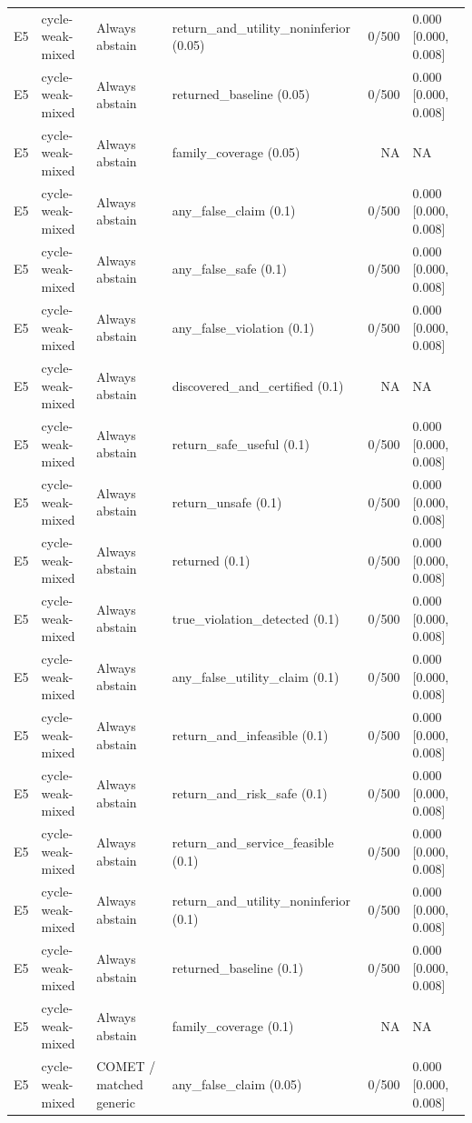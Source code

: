 \begin{longtable}{p{.04\linewidth}p{.18\linewidth}p{.19\linewidth}p{.16\linewidth}r p{.21\linewidth}}
E5 & cycle-weak-mixed & Always abstain & return\_and\_utility\_noninferior (0.05) & 0/500 & 0.000 [0.000, 0.008]\\
E5 & cycle-weak-mixed & Always abstain & returned\_baseline (0.05) & 0/500 & 0.000 [0.000, 0.008]\\
E5 & cycle-weak-mixed & Always abstain & family\_coverage (0.05) & NA & NA\\
E5 & cycle-weak-mixed & Always abstain & any\_false\_claim (0.1) & 0/500 & 0.000 [0.000, 0.008]\\
E5 & cycle-weak-mixed & Always abstain & any\_false\_safe (0.1) & 0/500 & 0.000 [0.000, 0.008]\\
E5 & cycle-weak-mixed & Always abstain & any\_false\_violation (0.1) & 0/500 & 0.000 [0.000, 0.008]\\
E5 & cycle-weak-mixed & Always abstain & discovered\_and\_certified (0.1) & NA & NA\\
E5 & cycle-weak-mixed & Always abstain & return\_safe\_useful (0.1) & 0/500 & 0.000 [0.000, 0.008]\\
E5 & cycle-weak-mixed & Always abstain & return\_unsafe (0.1) & 0/500 & 0.000 [0.000, 0.008]\\
E5 & cycle-weak-mixed & Always abstain & returned (0.1) & 0/500 & 0.000 [0.000, 0.008]\\
E5 & cycle-weak-mixed & Always abstain & true\_violation\_detected (0.1) & 0/500 & 0.000 [0.000, 0.008]\\
E5 & cycle-weak-mixed & Always abstain & any\_false\_utility\_claim (0.1) & 0/500 & 0.000 [0.000, 0.008]\\
E5 & cycle-weak-mixed & Always abstain & return\_and\_infeasible (0.1) & 0/500 & 0.000 [0.000, 0.008]\\
E5 & cycle-weak-mixed & Always abstain & return\_and\_risk\_safe (0.1) & 0/500 & 0.000 [0.000, 0.008]\\
E5 & cycle-weak-mixed & Always abstain & return\_and\_service\_feasible (0.1) & 0/500 & 0.000 [0.000, 0.008]\\
E5 & cycle-weak-mixed & Always abstain & return\_and\_utility\_noninferior (0.1) & 0/500 & 0.000 [0.000, 0.008]\\
E5 & cycle-weak-mixed & Always abstain & returned\_baseline (0.1) & 0/500 & 0.000 [0.000, 0.008]\\
E5 & cycle-weak-mixed & Always abstain & family\_coverage (0.1) & NA & NA\\
E5 & cycle-weak-mixed & COMET / matched generic & any\_false\_claim (0.05) & 0/500 & 0.000 [0.000, 0.008]\\

\end{longtable}
